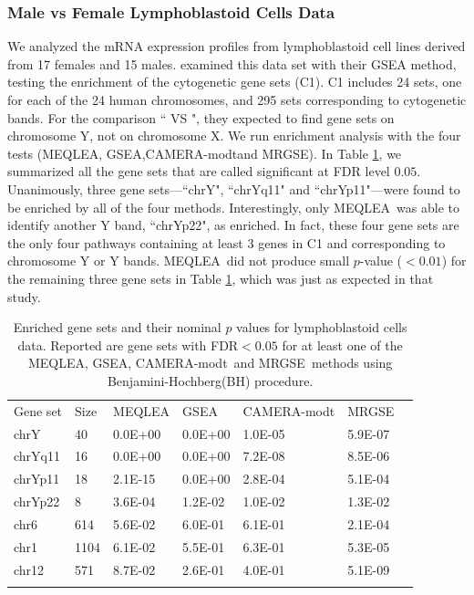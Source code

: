 \documentclass[a4,center,fleqn]{NAR}
\newcommand{\OurMethod}{MEQLEA}
\newcommand{\CMT}{CAMERA-modt}
\newcommand{\genr}{MRGSE}
\newcommand{\FDR}{Benjamini-Hochberg}
\newcommand{\FDRabb}{BH}
\begin{document}
	\subsubsection{Male vs Female Lymphoblastoid Cells Data}
	We analyzed the mRNA expression profiles from lymphoblastoid cell lines derived from 17 females and
	15 males. \cite{subramanian2005gene} examined this data set with their GSEA method, testing the
	enrichment of the  cytogenetic gene sets (C1). C1 includes 24 sets, one for each of the 24 human
	chromosomes, and 295 sets corresponding to cytogenetic bands. For the comparison `` VS
	", they expected to find gene sets on chromosome Y, not on chromosome X. We run
	enrichment analysis with the four tests (\OurMethod, GSEA,\CMT and \genr). In Table
	\ref{table:gender}, we summarized all the gene sets that are called significant at FDR level $0.05$.
	Unanimously, three gene sets---``chrY", ``chrYq11" and ``chrYp11"---were found to be enriched by all
	of the four methods. Interestingly, only \OurMethod~was able to identify another Y band, ``chrYp22",
	as enriched. In fact, these four gene sets are the only four pathways containing at least 3 genes in
	C1 and corresponding to chromosome Y or Y bands. \OurMethod~did not produce small $p$-value ($<
	0.01$) for the remaining three gene sets in Table \ref{table:gender}, which was just as expected in
	that study.
	
	\begin{table}[!ht]
		\centering
		\caption{Enriched gene sets and their nominal $p$ values for lymphoblastoid cells data. Reported
			are gene sets with FDR$<0.05$ for at least one of the \OurMethod, GSEA, \CMT~and \genr~methods using
			\FDR(\FDRabb) procedure.}
		\begin{tabular}{p{2cm}p{1cm}p{2cm}p{2cm}p{3cm}p{2cm}p{0.5cm}} \toprule
			Gene set & Size & \OurMethod & GSEA & \CMT & \genr \\ 		\colrule
			chrY & 40 & 0.0E+00 & 0.0E+00 & 1.0E-05 & 5.9E-07 \\ 
			chrYq11 & 16 & 0.0E+00 & 0.0E+00 & 7.2E-08 & 8.5E-06 \\ 
			chrYp11 & 18 & 2.1E-15 & 0.0E+00 & 2.8E-04 & 5.1E-04 \\ 
			chrYp22 & 8 & 3.6E-04 & 1.2E-02 & 1.0E-02 & 1.3E-02 \\ 
			chr6 & 614 & 5.6E-02 & 6.0E-01 & 6.1E-01 & 2.1E-04 \\ 
			chr1 & 1104 & 6.1E-02 & 5.5E-01 & 6.3E-01 & 5.3E-05 \\ 
			chr12 & 571 & 8.7E-02 & 2.6E-01 & 4.0E-01 & 5.1E-09 \\ 
			\botrule
		\end{tabular}
		\label{table:gender}
	\end{table}
	
\end{document}

